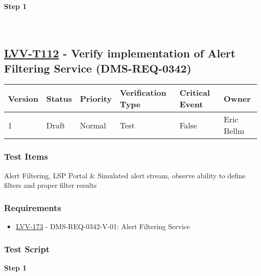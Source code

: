 \textbf{Step 1}\\
~\\
~\\

\hypertarget{lvv-t112---verify-implementation-of-alert-filtering-service-dms-req-0342}{%
\subsection{\texorpdfstring{\href{https://jira.lsstcorp.org/secure/Tests.jspa\#/testCase/LVV-T112}{LVV-T112}
- Verify implementation of Alert Filtering Service
(DMS-REQ-0342)}{LVV-T112 - Verify implementation of Alert Filtering Service (DMS-REQ-0342)}}\label{lvv-t112---verify-implementation-of-alert-filtering-service-dms-req-0342}}

\begin{longtable}[]{@{}llllll@{}}
\toprule
Version & Status & Priority & Verification Type & Critical Event &
Owner\tabularnewline
\midrule
\endhead
1 & Draft & Normal & Test & False & Eric Bellm\tabularnewline
\bottomrule
\end{longtable}

\hypertarget{test-items-88}{%
\subsubsection{Test Items}\label{test-items-88}}

Alert Filtering, LSP Portal \& Simulated alert stream, observe ability
to define filters and proper filter results

\hypertarget{requirements-89}{%
\subsubsection{Requirements}\label{requirements-89}}

\begin{itemize}
\tightlist
\item
  \href{https://jira.lsstcorp.org/browse/LVV-173}{LVV-173} -
  DMS-REQ-0342-V-01: Alert Filtering Service
\end{itemize}

\hypertarget{test-script-89}{%
\subsubsection{Test Script}\label{test-script-89}}

\textbf{Step 1}\\
~\\
~\\

